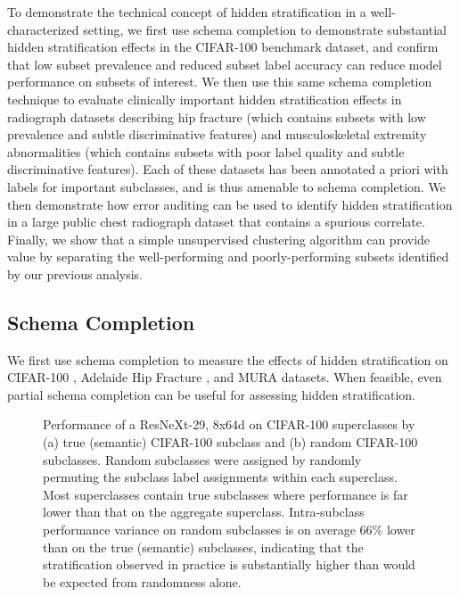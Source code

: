 \documentclass[sigconf,anonymous,review]{acmart}
\begin{document}
To demonstrate the technical concept of hidden stratification in a well-characterized setting, we first use schema completion to demonstrate substantial hidden stratification effects in the CIFAR-100 benchmark dataset, and confirm that low subset prevalence and reduced subset label accuracy can reduce model performance on subsets of interest.
We then use this same schema completion technique to evaluate clinically important hidden stratification effects in radiograph datasets describing hip fracture (which contains subsets with low prevalence and subtle discriminative features) and musculoskeletal extremity abnormalities (which contains subsets with poor label quality and subtle discriminative features).
Each of these datasets has been annotated a priori with labels for important subclasses, and is thus amenable to schema completion.
We then demonstrate how error auditing can be used to identify hidden stratification in a large public chest radiograph dataset that contains a spurious correlate.
Finally, we show that a simple unsupervised clustering algorithm can provide value by separating the well-performing and poorly-performing subsets identified by our previous analysis.

\subsection{Schema Completion}

We first use schema completion to measure the effects of hidden stratification on CIFAR-100 \citep{Krizhevsky2009-tq}, Adelaide Hip Fracture \citep{Gale_W_Oakden-Rayner_L_Carneiro_G_Bradley_AP_Palmer_LJ2017-tl},  and MURA \citep{Rajpurkar2017-rc} datasets.
When feasible, even partial schema completion can be useful for assessing hidden stratification.

 \begin{figure}[htb!]
 \centering
%
\caption{Performance of a ResNeXt-29, 8x64d on CIFAR-100 superclasses by (a) true (semantic) CIFAR-100 subclass and (b) random CIFAR-100 subclasses.  Random subclasses were assigned by randomly permuting the subclass label assignments within each superclass.  Most superclasses contain true subclasses where performance is far lower than that on the aggregate superclass.  Intra-subclass performance variance on random subclasses is on average 66\% lower than on the true (semantic) subclasses, indicating that the stratification observed in practice is substantially higher than would be expected from randomness alone.}
\label{fig:cifar}
\end{figure}
\end{document}
